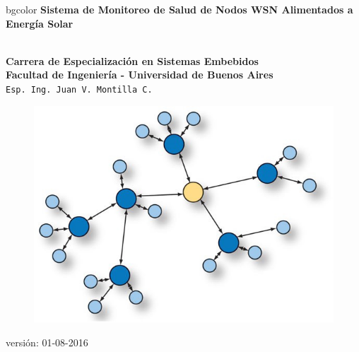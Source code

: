 \documentclass[aspectratio=169, handout]{beamer}
\begin{document}
\begingroup
\makeatletter
\setlength{\hoffset}{-.5\beamer@sidebarwidth}
\makeatother
\begin{frame}
\begin{center}
\hfill
    \begin{beamercolorbox}[center,dp=3ex,ht=10.25ex, wd=1\linewidth]{bgcolor}
        \Large\textbf{Sistema de Monitoreo de Salud de Nodos WSN Alimentados a Energía Solar}\\
    \end{beamercolorbox}
\hfill\hfill
\\
\vspace{5px}
\textbf{Carrera de Especialización en Sistemas Embebidos}\\
\textbf{Facultad de Ingeniería - Universidad de Buenos Aires}\\
\vspace{10px}
\texttt{Esp. Ing. Juan V. Montilla C.}\\

\vspace{10px}

\begin{figure}[H]
	\includegraphics[width=.3\textwidth]{./imagenes/red.jpg}
\end{figure}	

\vspace{5px}
\tiny versión: 01-08-2016 
 	  	
\end{center}
\end{frame}
\endgroup
\end{document}

